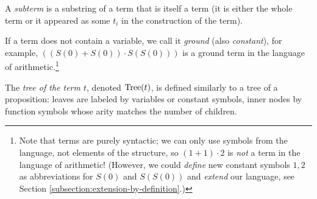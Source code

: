 A \emph{subterm} is a substring of a term that is itself a term (it is either the whole term or it appeared as some $t_i$ in the construction of the term).

If a term does not contain a variable, we call it \emph{ground} (also \emph{constant}), for example, $((S(0)+S(0))\cdot S(S(0)))$ is a ground term in the language of arithmetic.\footnote{Note that terms are purely syntactic; we can only use symbols from the language, not elements of the structure, so $(1+1)\cdot 2$ is \emph{not} a term in the language of arithmetic! (However, we could \emph{define} new constant symbols $1,2$ as abbreviations for $S(0)$ and $S(S(0))$ and \emph{extend} our language, see Section \ref{subsection:extension-by-definition}.)}

The \emph{tree of the term $t$}, denoted $\operatorname{Tree}(t)$, is defined similarly to a tree of a proposition: leaves are labeled by variables or constant symbols, inner nodes by function symbols whose arity matches the number of children.

